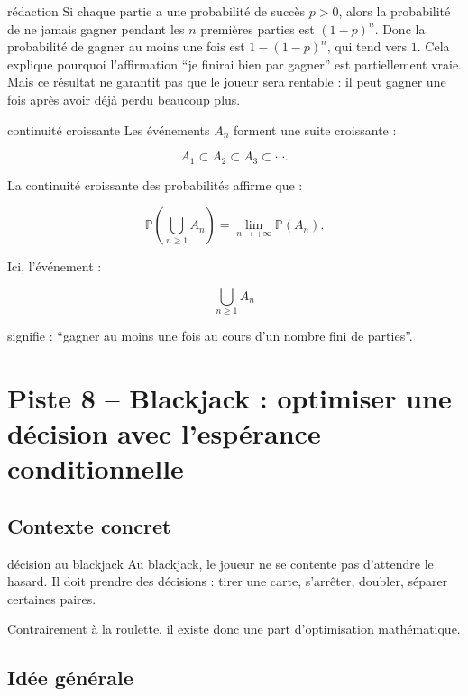 \documentclass[11pt,a4paper]{article}
\newcommand{\Prob}{\mathbb{P}}
\begin{document}
\begin{oral}{rédaction}
Si chaque partie a une probabilité de succès $p>0$, alors la probabilité de ne jamais gagner pendant les $n$ premières parties est $(1-p)^n$. Donc la probabilité de gagner au moins une fois est $1-(1-p)^n$, qui tend vers $1$. Cela explique pourquoi l'affirmation ``je finirai bien par gagner'' est partiellement vraie. Mais ce résultat ne garantit pas que le joueur sera rentable : il peut gagner une fois après avoir déjà perdu beaucoup plus.
\end{oral}

\begin{prepa}{continuité croissante}
Les événements $A_n$ forment une suite croissante :

\[
A_1\subset A_2\subset A_3\subset\cdots.
\]

La continuité croissante des probabilités affirme que :

\[
\Prob\left(\bigcup_{n\geq1}A_n\right)
=
\lim_{n\to+\infty}\Prob(A_n).
\]

Ici, l'événement :

\[
\bigcup_{n\geq1}A_n
\]

signifie : ``gagner au moins une fois au cours d'un nombre fini de parties''.
\end{prepa}

\section{Piste 8 -- Blackjack : optimiser une décision avec l'espérance conditionnelle}

\subsection{Contexte concret}

\begin{contexte}{décision au blackjack}
Au blackjack, le joueur ne se contente pas d'attendre le hasard. Il doit prendre des décisions : tirer une carte, s'arrêter, doubler, séparer certaines paires.

Contrairement à la roulette, il existe donc une part d'optimisation mathématique.
\end{contexte}

\subsection{Idée générale}
\end{document}
